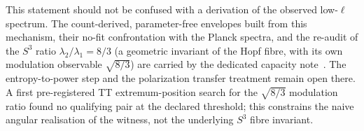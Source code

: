 This statement should not be confused with a derivation of the observed low-$\ell$ spectrum.
The count-derived, parameter-free envelopes built from this mechanism, their no-fit confrontation with the
Planck spectra, and the re-audit of the $S^3$ ratio $\lambda_2/\lambda_1 = 8/3$ (a geometric invariant of the
Hopf fibre, with its own modulation observable $\sqrt{8/3}$) are carried by the dedicated capacity
note~\cite{Beau2026dhc}.
The entropy-to-power step and the polarization transfer treatment remain open there.
A first pre-registered TT extremum-position search for the $\sqrt{8/3}$ modulation ratio found no qualifying
pair at the declared threshold; this constrains the naive angular realisation of the witness, not the
underlying $S^3$ fibre invariant.
